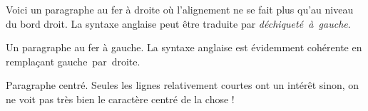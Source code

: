 \documentclass[12pt,a4paper,twoside]{article}
\begin{document}
{\raggedleft Voici un paragraphe au fer à
droite où l’alignement ne se fait plus
qu’au niveau du bord droit. La syntaxe
anglaise peut être traduite par
\emph{déchiqueté~à~gauche}.\par}
{\raggedright Un paragraphe au fer à gauche.
La syntaxe anglaise est évidemment
cohérente en remplaçant gauche~par~droite.\par}
{\centering Paragraphe centré. Seules les
lignes relativement courtes ont un intérêt
sinon, on ne voit pas très bien le
caractère centré de la chose !
\par}
\end{document}
